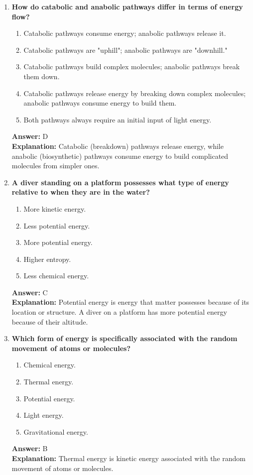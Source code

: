\documentclass[11pt, a4paper]{article}
\begin{document}
\begin{enumerate}[leftmargin=*, label=\arabic*.]
\item \textbf{How do catabolic and anabolic pathways differ in terms of energy flow?}
\begin{enumerate}[label=\Alph*.]
    \item Catabolic pathways consume energy; anabolic pathways release it.
    \item Catabolic pathways are "uphill"; anabolic pathways are "downhill."
    \item Catabolic pathways build complex molecules; anabolic pathways break them down.
    \item Catabolic pathways release energy by breaking down complex molecules; anabolic pathways consume energy to build them.
    \item Both pathways always require an initial input of light energy.
\end{enumerate}
\textbf{Answer:} D \\
\textbf{Explanation:} Catabolic (breakdown) pathways release energy, while anabolic (biosynthetic) pathways consume energy to build complicated molecules from simpler ones.

\item \textbf{A diver standing on a platform possesses what type of energy relative to when they are in the water?}
\begin{enumerate}[label=\Alph*.]
    \item More kinetic energy.
    \item Less potential energy.
    \item More potential energy.
    \item Higher entropy.
    \item Less chemical energy.
\end{enumerate}
\textbf{Answer:} C \\
\textbf{Explanation:} Potential energy is energy that matter possesses because of its location or structure. A diver on a platform has more potential energy because of their altitude.

\item \textbf{Which form of energy is specifically associated with the random movement of atoms or molecules?}
\begin{enumerate}[label=\Alph*.]
    \item Chemical energy.
    \item Thermal energy.
    \item Potential energy.
    \item Light energy.
    \item Gravitational energy.
\end{enumerate}
\textbf{Answer:} B \\
\textbf{Explanation:} Thermal energy is kinetic energy associated with the random movement of atoms or molecules.


\end{enumerate}
\end{document}
